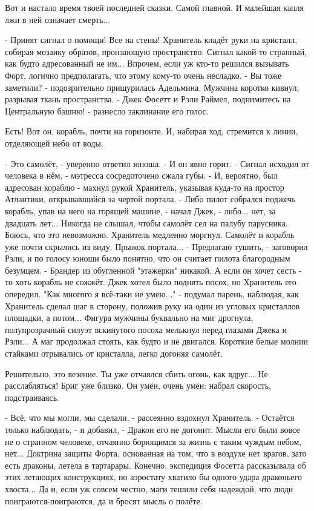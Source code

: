 Вот и настало время твоей последней сказки. Самой главной. И малейшая капля лжи в ней означает смерть...


 - Принят сигнал о помощи! Все на стены!
Хранитель кладёт руки на кристалл, собирая мозаику образов, пронзающую пространство. Сигнал какой-то странный, как будто адресованный не им... Впрочем, если уж кто-то решился вызывать Форт, логично предполагать, что этому кому-то очень несладко.
 - Вы тоже заметили? - подозрительно прищурилась Адельмина.
Мужчина коротко кивнул, разрывая ткань пространства.
 - Джек Фосетт и Рэли Раймел, поднимитесь на Центральную башню! - разнесло заклинание его голос.


Есть! Вот он, корабль, почти на горизонте. И, набирая ход, стремится к линии, отделяющей небо от воды.


 - Это самолёт, - уверенно ответил юноша. - И он явно горит.
 - Сигнал исходил от человека в нём, - мэтресса сосредоточено сжала губы.
 - И, вероятно, был адресован кораблю - махнул рукой Хранитель, указывая куда-то на простор Атлантики, открывавшийся за чертой портала.
 - Либо пилот собрался поджечь корабль, упав на него на горящей машине, - начал Джек, - либо... нет, за двадцать лет... Никогда не слышал, чтобы самолёт сел на палубу парусника. Боюсь, что это невозможно.
Хранитель медленно моргнул. Самолёт и корабль уже почти скрылись из виду. Прыжок портала...
 - Предлагаю тушить, - заговорил Рэли, и по голосу юноши было понятно, что он считает пилота благородным безумцем. - Брандер из обугленной "этажерки" никакой. А если он хочет сесть - то хоть корабль не сожжёт.
Джек хотел было поднять посох, но Хранитель его опередил. "Как многого я всё-таки не умею..." - подумал парень, наблюдая, как Хранитель сделал шаг в сторону, положив руку на один из угловых кристаллов площадки, а потом... Фигура мужчины буквально на миг дрогнула, полупрозрачный силуэт вскинутого посоха мелькнул перед глазами Джека и Рэли... А маг продолжал стоять, как будто и не двигался.
Короткие белые молнии стайками отрывались от кристалла, легко догоняя самолёт.


Решительно, это везение. Ты уже отчаялся сбить огонь, как вдруг... Не расслабляться! Бриг уже близко. Он умён, очень умён: набрал скорость, подстраиваясь.


 - Всё, что мы могли, мы сделали, - рассеянно вздохнул Хранитель. - Остаётся только наблюдать, - и добавил, - Дракон его не догонит.
Мысли его были вовсе не о странном человеке, отчаянно борющимся за жизнь с таким чуждым небом, нет... Доктрина защиты Форта, основанная на том, что в воздухе нет врагов, зато есть драконы, летела в тартарары. Конечно, экспедиция Фосетта рассказывала об этих летающих конструкциях, но аэростату хватило бы одного удара драконьего хвоста... Да и, если уж совсем честно, маги тешили себя надеждой, что люди поиграются-поиграются, да и бросят мысль о полёте.



